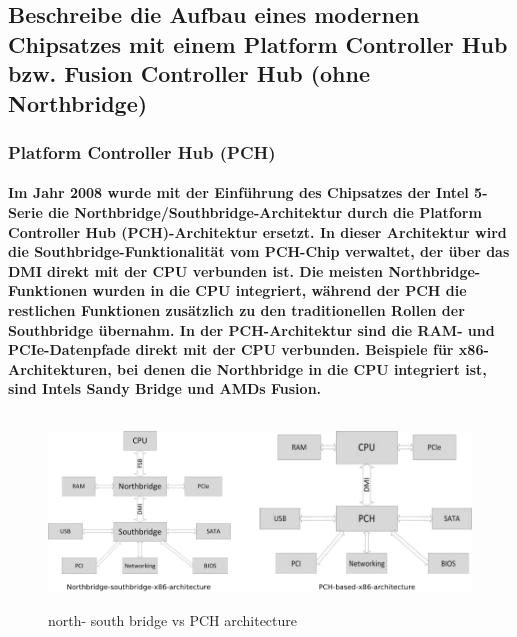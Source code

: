 \documentclass[a4paper]{article}
\begin{document}
    \subsection{\color{red}Beschreibe die Aufbau eines modernen Chipsatzes mit einem Platform Controller Hub bzw. Fusion Controller Hub (ohne Northbridge)}\label{subsec:beschreibe-die-aufbau-eines-modernen-chipsatzes-mit-einem-platform-controller-hub-bzw.-fusion-controller-hub-(ohne-northbridge)}

    \subsubsection{\color{codegreen}Platform Controller Hub (PCH)}
    \paragraph{\color{codegreen}Im Jahr 2008 wurde mit der Einführung des Chipsatzes der Intel 5-Serie die Northbridge/Southbridge-Architektur durch die Platform Controller Hub (PCH)-Architektur ersetzt. In dieser Architektur wird die Southbridge-Funktionalität vom PCH-Chip verwaltet, der über das DMI direkt mit der CPU verbunden ist.\newline
    Die meisten Northbridge-Funktionen wurden in die CPU integriert, während der PCH die restlichen Funktionen zusätzlich zu den traditionellen Rollen der Southbridge übernahm. In der PCH-Architektur sind die RAM- und PCIe-Datenpfade direkt mit der CPU verbunden. Beispiele für x86-Architekturen, bei denen die Northbridge in die CPU integriert ist, sind Intels Sandy Bridge und AMDs Fusion.\newline}

    \begin{center}
        \begin{figure}[H]
            \centering
            \includegraphics[height=5cm]{media/PCHVSN-S-bridge}
            \captionsetup{label-format=empty}
            \caption{north- south bridge vs PCH architecture}\label{fig:architecture}
        \end{figure}
    \end{center}
\end{document}
